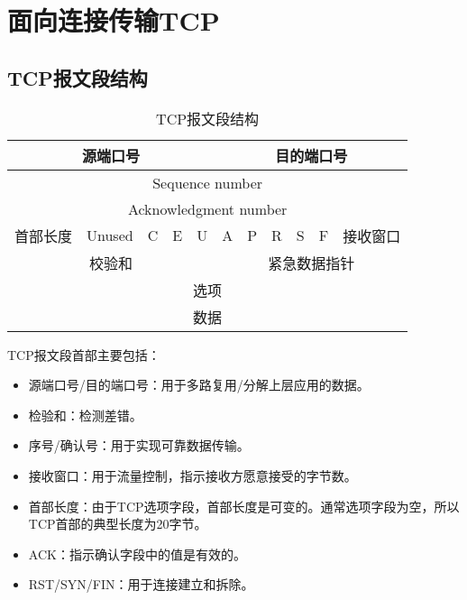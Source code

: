 \newpage

\section{面向连接传输TCP}

\subsection{TCP报文段结构}

\begin{table}[!ht]
	\center
	\begin{tabular}{|c|c|c|c|c|c|c|c|c|c|c|}
		\hline
		\multicolumn{5}{|c|}{源端口号} & \multicolumn{6}{|c|}{目的端口号}                                              \\
		\hline
		\multicolumn{11}{|c|}{Sequence number}                                                                         \\
		\hline
		\multicolumn{11}{|c|}{Acknowledgment number}                                                                   \\
		\hline
		首部长度                       & Unused                             & C & E & U & A & P & R & S & F & 接收窗口 \\
		\hline
		\multicolumn{5}{|c|}{校验和}   & \multicolumn{6}{|c|}{紧急数据指针}                                            \\
		\hline
		\multicolumn{11}{|c|}{选项}                                                                                    \\
		\hline
		\multicolumn{11}{|c|}{数据}                                                                                    \\
		\hline
	\end{tabular}
	\caption{TCP报文段结构}
\end{table}

TCP报文段首部主要包括：

\begin{itemize}
	\item 源端口号/目的端口号：用于多路复用/分解上层应用的数据。

	\item 检验和：检测差错。

	\item 序号/确认号：用于实现可靠数据传输。

	\item 接收窗口：用于流量控制，指示接收方愿意接受的字节数。

	\item 首部长度：由于TCP选项字段，首部长度是可变的。通常选项字段为空，所以TCP首部的典型长度为20字节。

	\item ACK：指示确认字段中的值是有效的。

	\item RST/SYN/FIN：用于连接建立和拆除。
\end{itemize}

